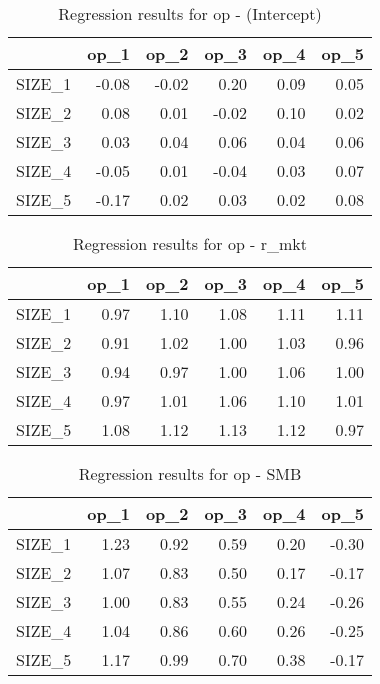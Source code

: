 \begin{table}[ht]
\centering
\caption{Regression results for op - (Intercept)} 
\begin{tabular}{rrrrrr}
  \hline
 & op\_1 & op\_2 & op\_3 & op\_4 & op\_5 \\ 
  \hline
SIZE\_1 & -0.08 & -0.02 & 0.20 & 0.09 & 0.05 \\ 
  SIZE\_2 & 0.08 & 0.01 & -0.02 & 0.10 & 0.02 \\ 
  SIZE\_3 & 0.03 & 0.04 & 0.06 & 0.04 & 0.06 \\ 
  SIZE\_4 & -0.05 & 0.01 & -0.04 & 0.03 & 0.07 \\ 
  SIZE\_5 & -0.17 & 0.02 & 0.03 & 0.02 & 0.08 \\ 
   \hline
\end{tabular}
\end{table}


\begin{table}[ht]
\centering
\caption{Regression results for op - r_mkt} 
\begin{tabular}{rrrrrr}
  \hline
 & op\_1 & op\_2 & op\_3 & op\_4 & op\_5 \\ 
  \hline
SIZE\_1 & 0.97 & 1.10 & 1.08 & 1.11 & 1.11 \\ 
  SIZE\_2 & 0.91 & 1.02 & 1.00 & 1.03 & 0.96 \\ 
  SIZE\_3 & 0.94 & 0.97 & 1.00 & 1.06 & 1.00 \\ 
  SIZE\_4 & 0.97 & 1.01 & 1.06 & 1.10 & 1.01 \\ 
  SIZE\_5 & 1.08 & 1.12 & 1.13 & 1.12 & 0.97 \\ 
   \hline
\end{tabular}
\end{table}


\begin{table}[ht]
\centering
\caption{Regression results for op - SMB} 
\begin{tabular}{rrrrrr}
  \hline
 & op\_1 & op\_2 & op\_3 & op\_4 & op\_5 \\ 
  \hline
SIZE\_1 & 1.23 & 0.92 & 0.59 & 0.20 & -0.30 \\ 
  SIZE\_2 & 1.07 & 0.83 & 0.50 & 0.17 & -0.17 \\ 
  SIZE\_3 & 1.00 & 0.83 & 0.55 & 0.24 & -0.26 \\ 
  SIZE\_4 & 1.04 & 0.86 & 0.60 & 0.26 & -0.25 \\ 
  SIZE\_5 & 1.17 & 0.99 & 0.70 & 0.38 & -0.17 \\ 
   \hline
\end{tabular}
\end{table}



